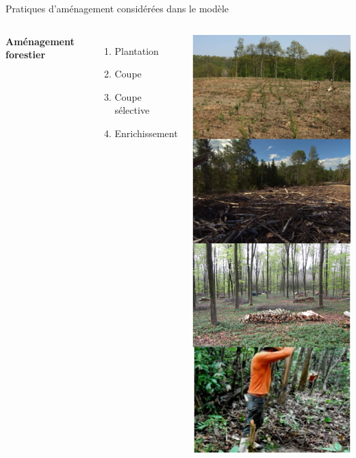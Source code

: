 \documentclass[11pt, compress, aspectratio=1610]{beamer}
\providecommand{\tightlist}{%
  \setlength{\itemsep}{0pt}\setlength{\parskip}{0pt}}
\newcommand{\begincols}{\begin{columns}}
\newcommand{\stopcols}{\end{columns}}
\begin{document}
\begin{frame}{Pratiques d’aménagement considérées dans le modèle}
\protect\hypertarget{pratiques-damuxe9nagement-considuxe9ruxe9es-dans-le-moduxe8le}{}

\begincols
{}

\textbf{Aménagement forestier}

\begin{enumerate}

    \tightlist
    \item
      Plantation
    \item
      Coupe
    \item
      Coupe sélective
    \item
      Enrichissement
  \end{enumerate}

\hfill{}
    \centering

\includegraphics[scale=0.50]{figures/managPrac}

\par
\stopcols

\end{frame}
\end{document}
